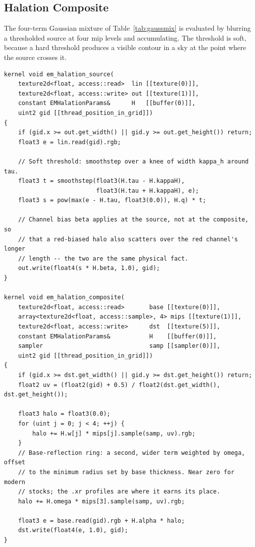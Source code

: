 \subsection{Halation Composite}

The four-term Gaussian mixture of Table~\ref{tab:gaussmix} is evaluated by
blurring a thresholded source at four mip levels and accumulating. The
threshold is soft, because a hard threshold produces a visible contour in a
sky at the point where the source crosses it.

\begin{lstlisting}[language=Metal, caption={Halation source extraction and composite.}]
kernel void em_halation_source(
    texture2d<float, access::read>  lin [[texture(0)]],
    texture2d<float, access::write> out [[texture(1)]],
    constant EMHalationParams&      H   [[buffer(0)]],
    uint2 gid [[thread_position_in_grid]])
{
    if (gid.x >= out.get_width() || gid.y >= out.get_height()) return;
    float3 e = lin.read(gid).rgb;

    // Soft threshold: smoothstep over a knee of width kappa_h around tau.
    float3 t = smoothstep(float3(H.tau - H.kappaH),
                          float3(H.tau + H.kappaH), e);
    float3 s = pow(max(e - H.tau, float3(0.0)), H.q) * t;

    // Channel bias beta applies at the source, not at the composite, so
    // that a red-biased halo also scatters over the red channel's longer
    // length -- the two are the same physical fact.
    out.write(float4(s * H.beta, 1.0), gid);
}

kernel void em_halation_composite(
    texture2d<float, access::read>       base [[texture(0)]],
    array<texture2d<float, access::sample>, 4> mips [[texture(1)]],
    texture2d<float, access::write>      dst  [[texture(5)]],
    constant EMHalationParams&           H    [[buffer(0)]],
    sampler                              samp [[sampler(0)]],
    uint2 gid [[thread_position_in_grid]])
{
    if (gid.x >= dst.get_width() || gid.y >= dst.get_height()) return;
    float2 uv = (float2(gid) + 0.5) / float2(dst.get_width(), dst.get_height());

    float3 halo = float3(0.0);
    for (uint j = 0; j < 4; ++j) {
        halo += H.w[j] * mips[j].sample(samp, uv).rgb;
    }
    // Base-reflection ring: a second, wider term weighted by omega, offset
    // to the minimum radius set by base thickness. Near zero for modern
    // stocks; the .xr profiles are where it earns its place.
    halo += H.omega * mips[3].sample(samp, uv).rgb;

    float3 e = base.read(gid).rgb + H.alpha * halo;
    dst.write(float4(e, 1.0), gid);
}
\end{lstlisting}

